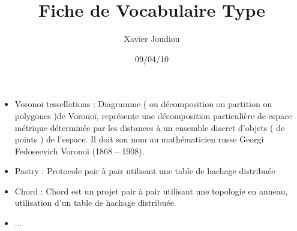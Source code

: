 \documentclass[11pt,a4paper]{article}
\title{Fiche de Vocabulaire Type}
\author{Xavier Joudiou}
\date{09/04/10}
\begin{document}
	
  \begin{itemize}
  \renewcommand{\labelitemi}{$\Rightarrow$}
	\item Voronoi tessellations : Diagramme ( ou décomposition ou partition ou polygones )de Voronoï, représente une décomposition particulière de espace métrique déterminée par les distances à un ensemble discret d'objets ( de points ) de l'espace. Il doit son nom au mathématicien russe Georgi Fedoseevich Voronoï (1868 – 1908).
	\item Pastry : Protocole pair à pair utilisant une table de hachage distribuée
	\item Chord : Chord est un projet pair à pair utilisant une topologie en anneau, utilisation d'un table de hachage distribuée.
	\item ...
  \end{itemize}
\end{document}

